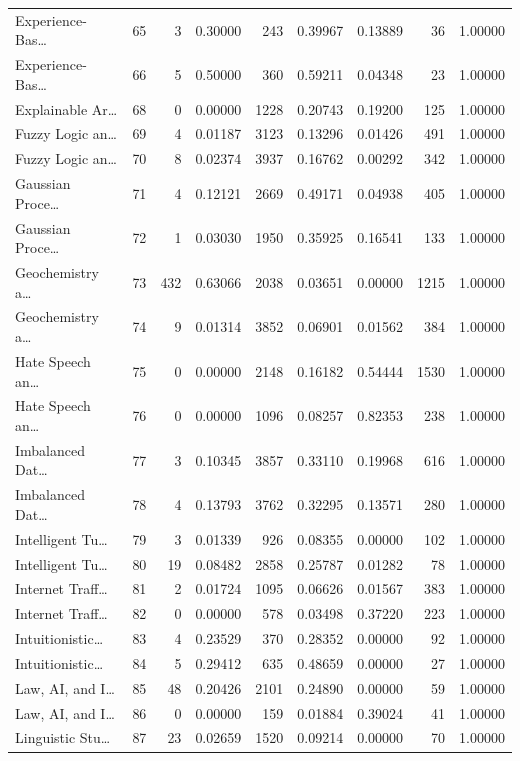 \begin{table}
\begin{tabular}{lrrrrrrrr}
Experience-Bas… & 65 & 3 & 0.30000 & 243 & 0.39967 & 0.13889 & 36 & 1.00000 \\
Experience-Bas… & 66 & 5 & 0.50000 & 360 & 0.59211 & 0.04348 & 23 & 1.00000 \\
Explainable Ar… & 68 & 0 & 0.00000 & 1228 & 0.20743 & 0.19200 & 125 & 1.00000 \\
Fuzzy Logic an… & 69 & 4 & 0.01187 & 3123 & 0.13296 & 0.01426 & 491 & 1.00000 \\
Fuzzy Logic an… & 70 & 8 & 0.02374 & 3937 & 0.16762 & 0.00292 & 342 & 1.00000 \\
Gaussian Proce… & 71 & 4 & 0.12121 & 2669 & 0.49171 & 0.04938 & 405 & 1.00000 \\
Gaussian Proce… & 72 & 1 & 0.03030 & 1950 & 0.35925 & 0.16541 & 133 & 1.00000 \\
Geochemistry a… & 73 & 432 & 0.63066 & 2038 & 0.03651 & 0.00000 & 1215 & 1.00000 \\
Geochemistry a… & 74 & 9 & 0.01314 & 3852 & 0.06901 & 0.01562 & 384 & 1.00000 \\
Hate Speech an… & 75 & 0 & 0.00000 & 2148 & 0.16182 & 0.54444 & 1530 & 1.00000 \\
Hate Speech an… & 76 & 0 & 0.00000 & 1096 & 0.08257 & 0.82353 & 238 & 1.00000 \\
Imbalanced Dat… & 77 & 3 & 0.10345 & 3857 & 0.33110 & 0.19968 & 616 & 1.00000 \\
Imbalanced Dat… & 78 & 4 & 0.13793 & 3762 & 0.32295 & 0.13571 & 280 & 1.00000 \\
Intelligent Tu… & 79 & 3 & 0.01339 & 926 & 0.08355 & 0.00000 & 102 & 1.00000 \\
Intelligent Tu… & 80 & 19 & 0.08482 & 2858 & 0.25787 & 0.01282 & 78 & 1.00000 \\
Internet Traff… & 81 & 2 & 0.01724 & 1095 & 0.06626 & 0.01567 & 383 & 1.00000 \\
Internet Traff… & 82 & 0 & 0.00000 & 578 & 0.03498 & 0.37220 & 223 & 1.00000 \\
Intuitionistic… & 83 & 4 & 0.23529 & 370 & 0.28352 & 0.00000 & 92 & 1.00000 \\
Intuitionistic… & 84 & 5 & 0.29412 & 635 & 0.48659 & 0.00000 & 27 & 1.00000 \\
Law, AI, and I… & 85 & 48 & 0.20426 & 2101 & 0.24890 & 0.00000 & 59 & 1.00000 \\
Law, AI, and I… & 86 & 0 & 0.00000 & 159 & 0.01884 & 0.39024 & 41 & 1.00000 \\
Linguistic Stu… & 87 & 23 & 0.02659 & 1520 & 0.09214 & 0.00000 & 70 & 1.00000 \\

\end{tabular}
\end{table}
